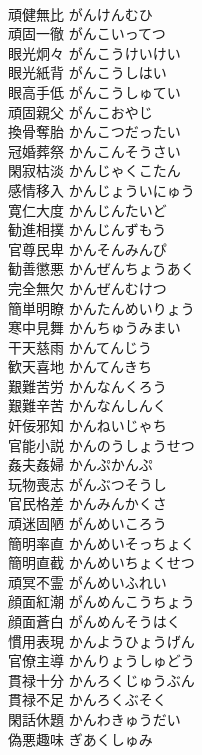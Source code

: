 \documentclass[8pt]{extreport}
\begin{document}
\begin{CJK}{UTF8}{min}
\\	頑健無比	がんけんむひ	
\\	頑固一徹	がんこいってつ	
\\	眼光炯々	がんこうけいけい	
\\	眼光紙背	がんこうしはい	
\\	眼高手低	がんこうしゅてい	
\\	頑固親父	がんこおやじ	
\\	換骨奪胎	かんこつだったい	
\\	冠婚葬祭	かんこんそうさい	
\\	閑寂枯淡	かんじゃくこたん	
\\	感情移入	かんじょういにゅう	
\\	寛仁大度	かんじんたいど	
\\	勧進相撲	かんじんずもう	
\\	官尊民卑	かんそんみんぴ	
\\	勧善懲悪	かんぜんちょうあく	
\\	完全無欠	かんぜんむけつ	
\\	簡単明瞭	かんたんめいりょう	
\\	寒中見舞	かんちゅうみまい	
\\	干天慈雨	かんてんじう	
\\	歓天喜地	かんてんきち	
\\	艱難苦労	かんなんくろう	
\\	艱難辛苦	かんなんしんく	
\\	奸佞邪知	かんねいじゃち	
\\	官能小説	かんのうしょうせつ	
\\	姦夫姦婦	かんぷかんぷ	
\\	玩物喪志	がんぶつそうし	
\\	官民格差	かんみんかくさ	
\\	頑迷固陋	がんめいころう	
\\	簡明率直	かんめいそっちょく	
\\	簡明直截	かんめいちょくせつ	
\\	頑冥不霊	がんめいふれい	
\\	顔面紅潮	がんめんこうちょう	
\\	顔面蒼白	がんめんそうはく	
\\	慣用表現	かんようひょうげん	
\\	官僚主導	かんりょうしゅどう	
\\	貫禄十分	かんろくじゅうぶん	
\\	貫禄不足	かんろくぶそく	
\\	閑話休題	かんわきゅうだい	
\\	偽悪趣味	ぎあくしゅみ	

\end{CJK}
\end{document}
